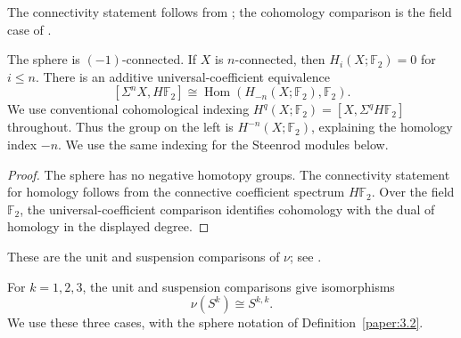 \begin{theorem}

\label{sem:Literature:connected-homology}
The connectivity statement follows from \cite[Proposition II.5.22]{SchwedeSymmetricSpectra}; the cohomology comparison is the field case of \cite[Theorem IV.4.5]{EKMM}.\par

The sphere is $(-1)$-connected. If $X$ is $n$-connected, then
$H_i(X;\mathbb F_2)=0$ for $i\le n$. There is an additive
universal-coefficient equivalence
\[
 [\Sigma^nX,H\mathbb F_2]\cong
 \operatorname{Hom}(H_{-n}(X;\mathbb F_2),\mathbb F_2).
\]
We use conventional cohomological indexing
$H^q(X;\mathbb F_2)=[X,\Sigma^qH\mathbb F_2]$ throughout.
Thus the group on the left is $H^{-n}(X;\mathbb F_2)$, explaining
the homology index $-n$. We use the same indexing for the Steenrod
modules below.


\end{theorem}
\begin{proof}
The sphere has no negative homotopy groups. The connectivity statement
for homology follows from the connective coefficient spectrum
$H\mathbb F_2$. Over the field $\mathbb F_2$, the universal-coefficient
comparison identifies cohomology with the dual of homology in the
displayed degree.
\end{proof}

\begin{proposition}
\label{sem:Literature:low-sphere-comparisons}
These are the unit and suspension comparisons of $\nu$; see
\cite[Definition 3.2]{LWX126}.\par

For $k=1,2,3$, the unit and suspension comparisons give isomorphisms
\[\nu(S^k)\cong S^{k,k}.\]
We use these three cases, with the sphere notation of
Definition~\ref{paper:3.2}.

\end{proposition}

